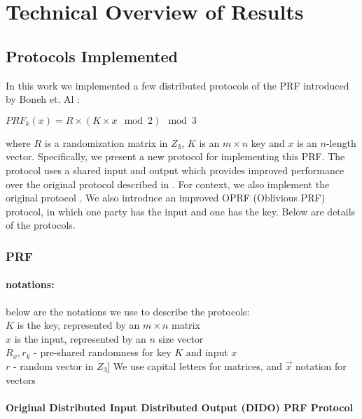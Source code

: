 
\section{Technical Overview of Results}
\label{sec:technical_overview}

\subsection{Protocols Implemented}

In this work we implemented a few distributed protocols of the PRF introduced by Boneh et. Al  \cite{darkmatter}:

$PRF_k(x) = R \times (K \times x \mod 2)  \mod 3 $

where $R$ is a randomization matrix in $Z_3$, $K$ is an $m \times n$ key and $x$ is an $n$-length vector. Specifically, we present a new protocol for implementing this PRF. The protocol uses a shared input and output which provides improved performance over the original protocol described in \cite{darkmatter}. For context, we also implement the original protocol \cite{darkmatter} . We also introduce an improved OPRF (Oblivious PRF) protocol, in which one party has the input and one has the key. Below are  details of the protocols.

\subsubsection{PRF}

\paragraph{notations:} below are the notations we use to describe the protocols: \\
$K$ is the key, represented by an $m \times n$ matrix \\
$x$ is the input, represented by an $n$ size vector \\
$R_x, r_k$ - pre-shared randomness for key $K$ and input $x$ \\
$r$ - random vector in $Z_3$]
We use capital letters for matrices, and $\vec{x}$ notation for vectors \\


\paragraph{Original Distributed Input Distributed Output (DIDO) PRF Protocol}

